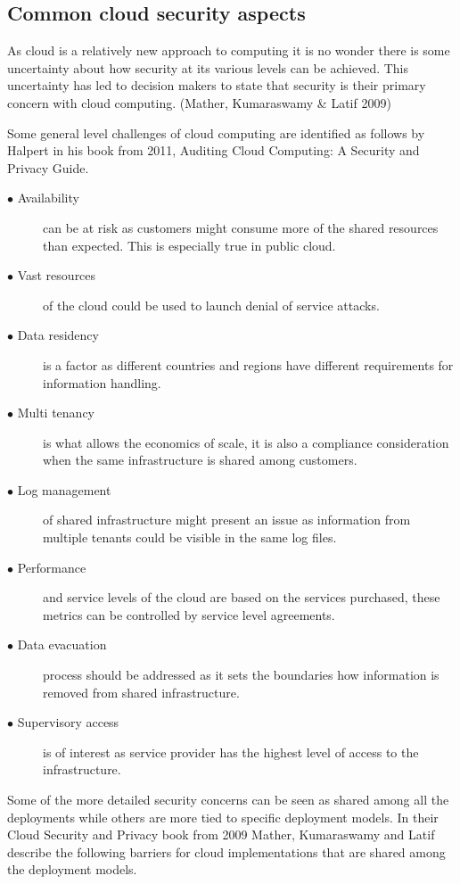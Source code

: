 \documentclass{article}
\begin{document}
\subsection{Common cloud security aspects}
As cloud is a relatively new approach to computing it is no wonder there is some uncertainty about how security at its various levels can be achieved. This uncertainty has led to decision makers to state that security is their primary concern with cloud computing. (Mather, Kumaraswamy \& Latif 2009)
\par
Some general level challenges of cloud computing are identified as follows by Halpert in his book from 2011, Auditing Cloud Computing: A Security and Privacy Guide.
\begin{description}
	\item[$\bullet$ Availability] can be at risk as customers might consume more of the shared resources than expected. This is especially true in public cloud.
	\item[$\bullet$ Vast resources] of the cloud could be used to launch denial of service attacks.
	\item[$\bullet$ Data residency] is a factor as different countries and regions have different requirements for information handling.
	\item[$\bullet$ Multi tenancy] is what allows the economics of scale, it is also a compliance consideration when the same infrastructure is shared among customers.
	\item[$\bullet$ Log management] of shared infrastructure might present an issue as information from multiple tenants could be visible in the same log files. 
	\item[$\bullet$ Performance] and service levels of the cloud are based on the services purchased, these metrics can be controlled by service level agreements.
	\item[$\bullet$ Data evacuation] process should be addressed as it sets the boundaries how information is removed from shared infrastructure.
	\item[$\bullet$ Supervisory access] is of interest as service provider has the highest level of access to the infrastructure.
\end{description}
Some of the more detailed security concerns can be seen as shared among all the deployments while others are more tied to specific deployment models.
In their Cloud Security and Privacy book from 2009 Mather, Kumaraswamy and Latif describe the following barriers for cloud implementations that are shared among the deployment models.
\end{document}
